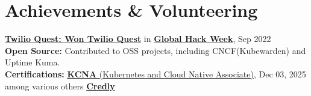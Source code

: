 \documentclass[letterpaper,11pt]{article}
\begin{document}
\section{Achievements \& Volunteering}
\begin{itemize}[leftmargin=0.15in, label={}]
  \small{\item{
        \textbf{\href{https://www.twilio.com/en-us}{Twilio Quest: }}{{\textbf{\href{{https://www.twilio.com/en-us}}{Won Twilio Quest}} in \textbf{\href{https://ghw.mlh.io/}{Global Hack Week}}, Sep 2022}} \\
        \textbf{Open Source: }{Contributed to OSS projects, including CNCF(Kubewarden) and Uptime Kuma. \\
        \textbf{Certifications:} \href{https://ti-user-certificates.s3.amazonaws.com/e0df7fbf-a057-42af-8a1f-590912be5460/23301a11-3def-42c0-9984-ad3edf0fa570-abhigyan-mohanta-7c38f3ba-8d67-483a-a642-6e9545f105d1-certificate.pdf}{\textbf{KCNA} (Kubernetes and Cloud Native Associate)}, Dec 03, 2025 among various others \href{https://credly.com/users/abhigyan-mohanta}{\textbf{Credly}}\\
        }}}
\end{itemize}
\end{document}
